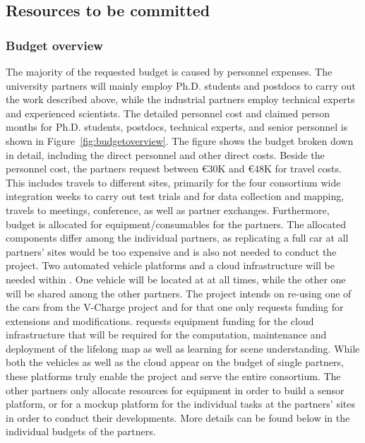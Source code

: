 

\subsection{Resources to be committed}
\label{sec:resources}
\subsubsection{Budget overview}
The majority of the requested budget is caused by personnel expenses. The university partners will mainly
employ Ph.D. students and postdocs to carry out the work described above, while the industrial partners employ technical experts and experienced scientists. The detailed personnel cost and claimed person months for Ph.D. students, postdocs, technical experts, and senior personnel is shown in Figure~\ref{fig:budgetoverview}. The
figure shows the budget broken down in detail, including the direct personnel and other direct costs.
Beside the personnel cost, the partners request between \euro30K and \euro48K for travel costs. This includes
travels to different sites, primarily for the four consortium wide integration weeks to carry out test trials and for data collection and mapping, travels to meetings, conference,
as well as partner exchanges.
Furthermore, budget is allocated for equipment/consumables for the partners. The allocated components differ among the
individual partners, as replicating a full car at all partners' sites would be too expensive and is also
not needed to conduct the project. Two automated vehicle platforms and a cloud infrastructure will be needed within \Project{}. One vehicle will
be located at \VW{} at all times, while the other one will be shared among the other partners. The project intends on re-using one of the cars from the V-Charge project and for that one \VW{} only requests funding for extensions and modifications. \IBM requests equipment funding for the cloud infrastructure that will be required for the computation, maintenance and deployment of the lifelong map as well as learning for scene understanding. While both the vehicles as well as the cloud appear on the budget of single partners, these platforms truly enable the project and serve the entire consortium.
 The other partners only allocate resources for equipment in order to build a sensor platform, or for a mockup platform for the individual tasks at the partners' sites in order to conduct their developments. More details can be found below in the individual budgets of the partners.

